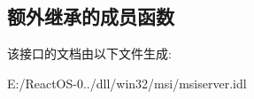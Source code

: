 \subsection*{额外继承的成员函数}


该接口的文档由以下文件生成\+:\begin{DoxyCompactItemize}
\item 
E\+:/\+React\+O\+S-\/0../dll/win32/msi/msiserver.\+idl\end{DoxyCompactItemize}
